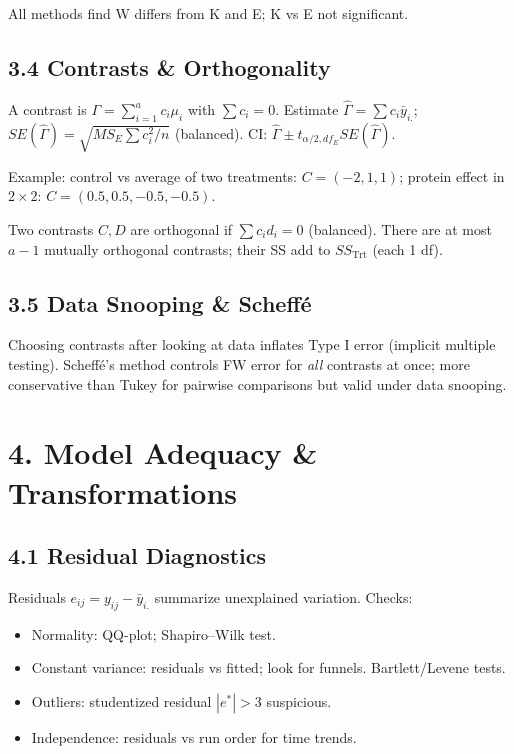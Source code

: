 \documentclass[9pt,letterpaper]{article}
\begin{document}
All methods find W differs from K and E; K vs E not significant.

\subsection{3.4 Contrasts \& Orthogonality}

A contrast is $\Gamma=\sum_{i=1}^a c_i\mu_i$ with $\sum c_i=0$. Estimate $\hat{\Gamma}=\sum c_i\bar{y}_{i.}$; $SE(\hat{\Gamma})=\sqrt{MS_E\sum c_i^2/n}$ (balanced). CI: $\hat{\Gamma}\pm t_{\alpha/2,df_E}SE(\hat{\Gamma})$.

Example: control vs average of two treatments: $C=(-2,1,1)$; protein effect in $2\times2$: $C=(0.5,0.5,-0.5,-0.5)$.

Two contrasts $C,D$ are orthogonal if $\sum c_id_i=0$ (balanced). There are at most $a-1$ mutually orthogonal contrasts; their SS add to $SS_{\text{Trt}}$ (each 1 df).

\subsection{3.5 Data Snooping \& Scheff\'e}

Choosing contrasts after looking at data inflates Type I error (implicit multiple testing). Scheff\'e's method controls FW error for \emph{all} contrasts at once; more conservative than Tukey for pairwise comparisons but valid under data snooping.

\section{4. Model Adequacy \& Transformations}

\subsection{4.1 Residual Diagnostics}

Residuals $e_{ij}=y_{ij}-\bar{y}_{i.}$ summarize unexplained variation. Checks:
\begin{itemize}
    \item Normality: QQ-plot; Shapiro--Wilk test.
    \item Constant variance: residuals vs fitted; look for funnels. Bartlett/Levene tests.
    \item Outliers: studentized residual $|e^*|>3$ suspicious.
    \item Independence: residuals vs run order for time trends.
\end{itemize}
\end{document}

